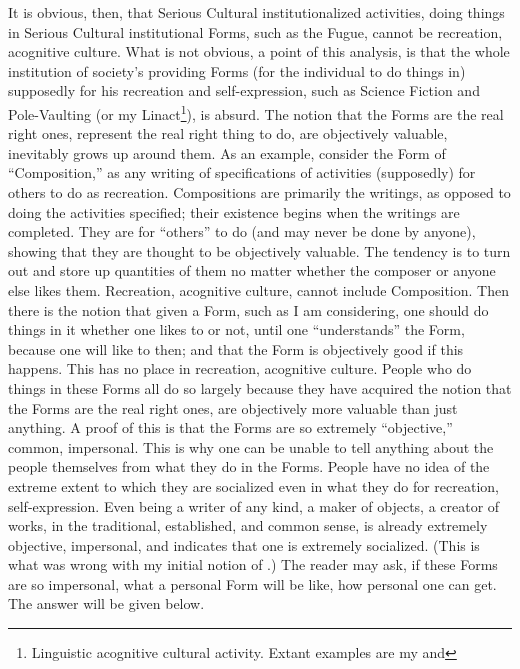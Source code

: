 It is obvious, then, that Serious Cultural institutionalized activities, doing things in Serious Cultural institutional Forms, such as the Fugue, cannot be recreation, acognitive culture. What is not obvious, a point of this analysis, is that the whole institution of society's providing Forms (for the individual to do things in) supposedly for his recreation and self-expression, such as Science Fiction and Pole-Vaulting (or my Linact\footnote{
Linguistic acognitive cultural activity. Extant examples are my  and }), is absurd. The notion that the Forms are the real right ones, represent the real right thing to do, are objectively valuable, inevitably grows up around them. As an example, consider the Form of \enquote{Composition,} as any writing of specifications of activities (supposedly) for others to do as recreation. Compositions are primarily the writings, as opposed to doing the activities specified; their existence begins when the writings are completed. They are for \enquote{others} to do (and may never be done by anyone), showing that they are thought to be objectively valuable. The tendency is to turn out and store up quantities of them no matter whether the composer or anyone else likes them. Recreation, acognitive culture, cannot include Composition. Then there is the notion that given a Form, such as I am considering, one should do things in it whether one likes to or not, until one \enquote{understands} the Form, because one will like to then; and that the Form is objectively good if this happens. This has no place in recreation, acognitive culture. People who do things in these Forms all do so largely because they have acquired the notion that the Forms are the real right ones, are objectively more valuable than just anything. A proof of this is that the Forms are so extremely \enquote{objective,} common, impersonal. This is why one can be unable to tell anything about the people themselves from what they do in the Forms. People have no idea of the extreme extent to which they are socialized even in what they do for recreation, self-expression. Even being a writer of any kind, a maker of objects, a creator of works, in the traditional, established, and common sense, is already extremely objective, impersonal, and indicates that one is extremely socialized. (This is what was wrong with my initial notion of .) The reader may ask, if these Forms are so impersonal, what a personal Form will be like, how personal one can get. The answer will be given below.

